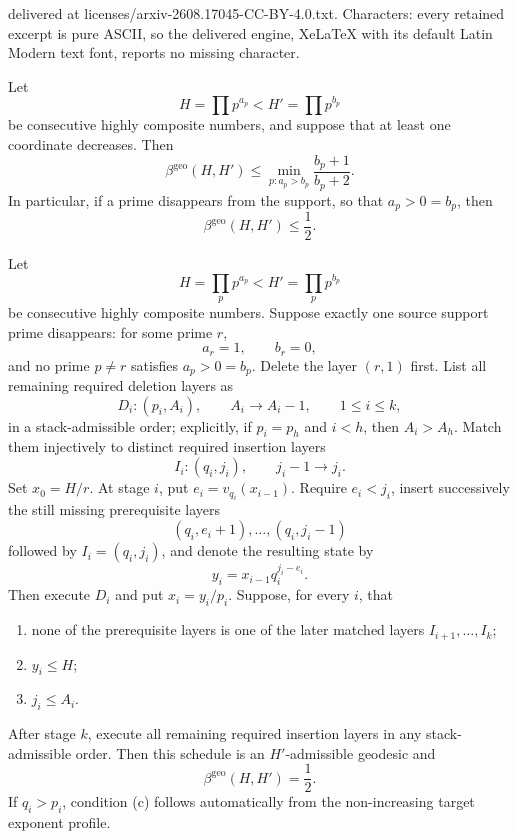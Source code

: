 \documentclass[10pt,a4paper]{amsart}
\newcommand{\betageo}{\beta^{\mathrm{geo}}}
\newcommand{\vpp}[2]{v_{#1}(#2)}
\begin{document}
delivered at licenses/arxiv-2608.17045-CC-BY-4.0.txt. Characters: every retained excerpt is pure ASCII, so the delivered engine, XeLaTeX with its default Latin Modern text font, reports no missing character.
\begin{proposition}
\label{prop:mandatory-deletion-upper}
Let
\[
 H=\prod p^{a_p}<H'=\prod p^{b_p}
\]
be consecutive highly composite numbers, and suppose that at least one coordinate decreases.  Then
\begin{equation}
 \boxed{
 \betageo(H,H')\le
 \min_{p:a_p>b_p}\frac{b_p+1}{b_p+2}.}
 \label{eq:mandatory-deletion-upper}
\end{equation}
In particular, if a prime disappears from the support, so that $a_p>0=b_p$, then
\begin{equation}
 \betageo(H,H')\le\frac12.
 \label{eq:support-loss-upper}
\end{equation}
\end{proposition}

\begin{theorem}
\label{thm:compensated-matching}
Let
\[
 H=\prod_p p^{a_p}<H'=\prod_p p^{b_p}
\]
be consecutive highly composite numbers.  Suppose exactly one source support prime disappears: for some prime $r$,
\[
 a_r=1,
 \qquad
 b_r=0,
\]
and no prime $p\ne r$ satisfies $a_p>0=b_p$.  Delete the layer $(r,1)$ first.  List all remaining required deletion layers as
\[
 D_i:(p_i,A_i),\qquad A_i\to A_i-1,
 \qquad 1\le i\le k,
\]
in a stack-admissible order; explicitly, if $p_i=p_h$ and $i<h$, then $A_i>A_h$.  Match them injectively to distinct required insertion layers
\[
 I_i:(q_i,j_i),\qquad j_i-1\to j_i.
\]
Set $x_0=H/r$.  At stage $i$, put $e_i=\vpp{q_i}{x_{i-1}}$.  Require $e_i<j_i$, insert successively the still missing prerequisite layers
\[
 (q_i,e_i+1),\ldots,(q_i,j_i-1)
\]
followed by $I_i=(q_i,j_i)$, and denote the resulting state by
\[
 y_i=x_{i-1}q_i^{j_i-e_i}.
\]
Then execute $D_i$ and put $x_i=y_i/p_i$.  Suppose, for every $i$, that
\begin{enumerate}[label=\textup{(\alph*)}]
\item none of the prerequisite layers is one of the later matched layers $I_{i+1},\ldots,I_k$;
\item $y_i\le H$;
\item $j_i\le A_i$.
\end{enumerate}
After stage $k$, execute all remaining required insertion layers in any stack-admissible order.  Then this schedule is an $H'$-admissible geodesic and
\begin{equation}
 \boxed{\betageo(H,H')=\frac12.}
 \label{eq:matching-equality}
\end{equation}
If $q_i>p_i$, condition (c) follows automatically from the non-increasing target exponent profile.
\end{theorem}
\end{document}
